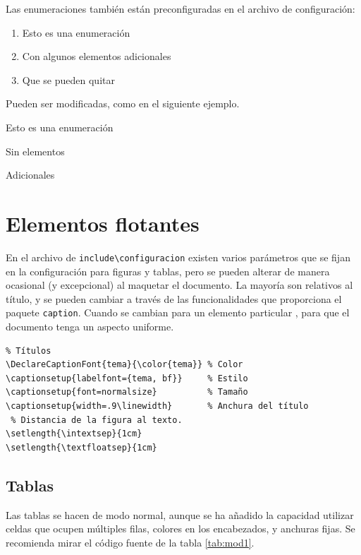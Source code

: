 Las enumeraciones también están preconfiguradas en el archivo de configuración:

\begin{enumerate}
\item Esto es una enumeración
\item Con algunos elementos adicionales
\item Que se pueden quitar
\end{enumerate}

Pueden ser modificadas, como en el siguiente ejemplo.

\begin{enumerate}[labelindent=\parindent ,leftmargin=*,label=\mbox{\bft{[Re \arabic*]}}]
\setcounter{enumi}{7}
\item Esto es una enumeración
\item Sin elementos
\item Adicionales
\end{enumerate}


\section{Elementos flotantes}

En el archivo de \verb+include\configuracion+ existen varios parámetros que se fijan en la configuración para figuras y tablas, pero se pueden alterar de manera ocasional (y excepcional) al maquetar el documento. La mayoría son relativos al título, y se pueden cambiar a través de las funcionalidades que proporciona el paquete \verb+caption+. Cuando se cambian para un elemento particular , para que el documento tenga un aspecto uniforme.

\begin{verbatim}
% Títulos
\DeclareCaptionFont{tema}{\color{tema}} % Color
\captionsetup{labelfont={tema, bf}}     % Estilo
\captionsetup{font=normalsize}          % Tamaño
\captionsetup{width=.9\linewidth}       % Anchura del título
 % Distancia de la figura al texto.
\setlength{\intextsep}{1cm} 
\setlength{\textfloatsep}{1cm}         
\end{verbatim}

\subsection{Tablas}
Las tablas se hacen de modo normal, aunque se ha añadido la capacidad utilizar celdas que ocupen múltiples filas, colores en los encabezados, y anchuras fijas. Se recomienda mirar el código fuente de la tabla \ref{tab:mod1}.\\

